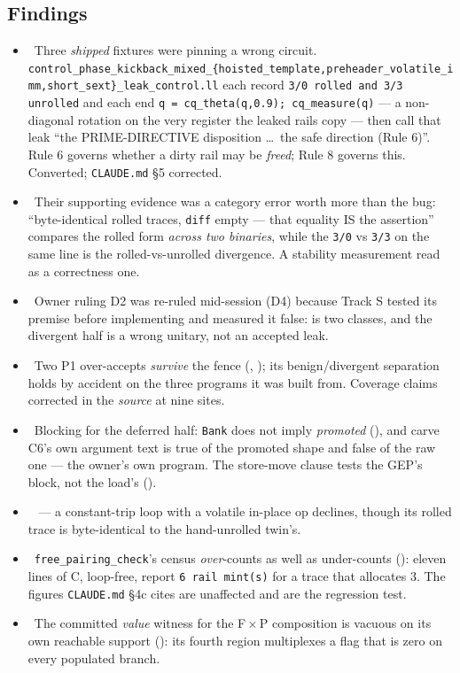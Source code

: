 \subsection*{Findings}
\begin{itemize}
  \item \fconfirmed\ Three \emph{shipped} fixtures were pinning a wrong circuit.
        \texttt{control\_phase\_kickback\_mixed\_\{hoisted\_template,preheader\_volatile\_imm,short\_sext\}\_leak\_control.ll}
        each record \texttt{3/0 rolled and 3/3 unrolled} and each end
        \texttt{q = cq\_theta(q,0.9); cq\_measure(q)} --- a non-diagonal rotation on the very
        register the leaked rails copy --- then call that leak ``the PRIME-DIRECTIVE
        disposition \ldots\ the safe direction (Rule 6)''. Rule 6 governs whether a dirty rail
        may be \emph{freed}; Rule 8 governs this. Converted; \texttt{CLAUDE.md} \S5 corrected.
  \item \fconfirmed\ Their supporting evidence was a category error worth more than the bug:
        ``byte-identical rolled traces, \texttt{diff} empty --- that equality IS the assertion''
        compares the rolled form \emph{across two binaries}, while the \texttt{3/0} vs
        \texttt{3/3} on the same line is the rolled-vs-unrolled divergence. A stability
        measurement read as a correctness one.
  \item \fconfirmed\ Owner ruling D2 was re-ruled mid-session (D4) because Track S tested its
        premise before implementing and measured it false:  is two classes, and the
        divergent half is a wrong unitary, not an accepted leak.
  \item \fconfirmed\ Two P1 over-accepts \emph{survive} the  fence (,
        ); its benign/divergent separation holds by accident on the three programs it
        was built from. Coverage claims corrected in the \emph{source} at nine sites.
  \item \fconfirmed\ Blocking for the deferred half: \texttt{Bank} does not imply
        \emph{promoted} (), and carve C6's own argument text is true of the promoted
        shape and false of the raw one --- the owner's own program. The store-move clause
        tests the GEP's block, not the load's ().
  \item \foverdecline\  --- a constant-trip loop with a volatile in-place op declines,
        though its rolled trace is byte-identical to the hand-unrolled twin's.
  \item \fconfirmed\ \texttt{free\_pairing\_check}'s census \emph{over}-counts as well as
        under-counts (): eleven lines of C, loop-free, report \texttt{6 rail mint(s)}
        for a trace that allocates 3. The figures \texttt{CLAUDE.md} \S4c cites are unaffected and are
        the regression test.
  \item \fconfirmed\ The committed \emph{value} witness for the F\,$\times$\,P composition is
        vacuous on its own reachable support (): its fourth region multiplexes a flag
        that is zero on every populated branch.
\end{itemize}

